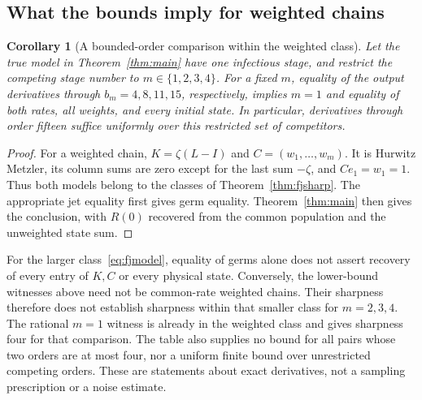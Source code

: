\documentclass[11pt]{article}
\newtheorem{corollary}[theorem]{Corollary}
\theoremstyle{remark}\newtheorem{remark}[theorem]{Remark}
\begin{document}
\subsection{What the bounds imply for weighted chains}
\begin{corollary}[A bounded-order comparison within the weighted class]\label{cor:fjW}
Let the true model in Theorem~\ref{thm:main} have one infectious stage,
and restrict the competing stage number to $m\in\{1,2,3,4\}$.
For a fixed $m$, equality of the output derivatives through
$b_m=4,8,11,15$, respectively, implies $m=1$ and equality of both rates,
all weights, and every initial state. In particular, derivatives through
order fifteen suffice uniformly over this restricted set of competitors.
\end{corollary}
\begin{proof}
For a weighted chain, $K=\zeta(L-I)$ and $C=(w_1,\ldots,w_m)$.
It is Hurwitz Metzler, its column sums are zero except for the last
sum $-\zeta$, and $Ce_1=w_1=1$. Thus both models belong to the classes
of Theorem~\ref{thm:fjsharp}. The appropriate jet equality first gives
germ equality. Theorem~\ref{thm:main} then gives the conclusion, with
$R(0)$ recovered from the common population and the unweighted state sum.
\end{proof}

For the larger class~\eqref{eq:fjmodel}, equality of germs alone does not
assert recovery of every entry of $K,C$ or every physical state. Conversely,
the lower-bound witnesses above need not be common-rate weighted chains.
Their sharpness therefore does not establish sharpness within that smaller
class for $m=2,3,4$. The rational $m=1$ witness is already in the weighted
class and gives sharpness four for that comparison. The table also supplies
no bound for all pairs whose two orders are at most four, nor a uniform
finite bound over unrestricted competing orders. These are statements
about exact derivatives, not a sampling prescription or a noise estimate.
\end{document}
